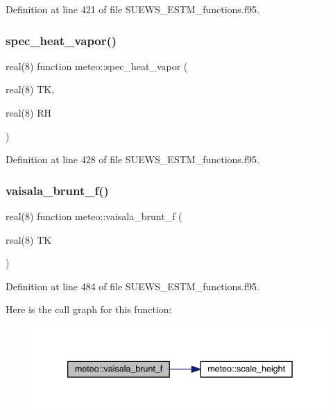 Definition at line 421 of file S\+U\+E\+W\+S\+\_\+\+E\+S\+T\+M\+\_\+functions.\+f95.

\mbox{\label{namespacemeteo_a2458549db90b31c67886950a36fe2370}} 
\subsubsection{\texorpdfstring{spec\+\_\+heat\+\_\+vapor()}{spec\_heat\_vapor()}}
{\footnotesize\ttfamily real(8) function meteo\+::spec\+\_\+heat\+\_\+vapor (\begin{DoxyParamCaption}\item[{real(8)}]{TK,  }\item[{real(8)}]{RH }\end{DoxyParamCaption})}



Definition at line 428 of file S\+U\+E\+W\+S\+\_\+\+E\+S\+T\+M\+\_\+functions.\+f95.

\mbox{\label{namespacemeteo_a60b3a3a3f1d7b40ed8b9fd4b55a9e06b}} 
\subsubsection{\texorpdfstring{vaisala\+\_\+brunt\+\_\+f()}{vaisala\_brunt\_f()}}
{\footnotesize\ttfamily real(8) function meteo\+::vaisala\+\_\+brunt\+\_\+f (\begin{DoxyParamCaption}\item[{real(8)}]{TK }\end{DoxyParamCaption})}



Definition at line 484 of file S\+U\+E\+W\+S\+\_\+\+E\+S\+T\+M\+\_\+functions.\+f95.

Here is the call graph for this function\+:\nopagebreak
\begin{figure}[H]
\begin{center}
\leavevmode
\includegraphics[width=339pt]{namespacemeteo_a60b3a3a3f1d7b40ed8b9fd4b55a9e06b_cgraph}
\end{center}
\end{figure}


